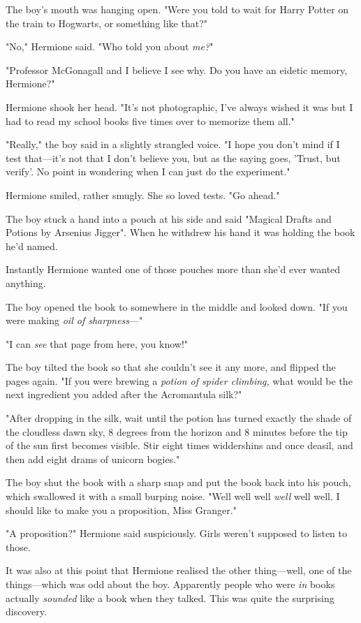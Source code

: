 The boy's mouth was hanging open. "Were you told to wait for Harry Potter on the train to Hogwarts, or something like that?"

"No," Hermione said. "Who told you about \emph{me?}"

"Professor McGonagall and I believe I see why. Do you have an eidetic memory, Hermione?"

Hermione shook her head. "It's not photographic, I've always wished it was but I had to read my school books five times over to memorize them all."

"Really," the boy said in a slightly strangled voice. "I hope you don't mind if I test that---it's not that I don't believe you, but as the saying goes, 'Trust, but verify'. No point in wondering when I can just do the experiment."

Hermione smiled, rather smugly. She so loved tests. "Go ahead."

The boy stuck a hand into a pouch at his side and said "Magical Drafts and Potions by Arsenius Jigger". When he withdrew his hand it was holding the book he'd named.

Instantly Hermione wanted one of those pouches more than she'd ever wanted anything.

The boy opened the book to somewhere in the middle and looked down. "If you were making \emph{oil of sharpness}---"

"I can \emph{see} that page from here, you know!"

The boy tilted the book so that she couldn't see it any more, and flipped the pages again. "If you were brewing a \emph{potion of spider climbing,} what would be the next ingredient you added after the Acromantula silk?"

"After dropping in the silk, wait until the potion has turned exactly the shade of the cloudless dawn sky, 8 degrees from the horizon and 8 minutes before the tip of the sun first becomes visible. Stir eight times widdershins and once deasil, and then add eight drams of unicorn bogies."

The boy shut the book with a sharp snap and put the book back into his pouch, which swallowed it with a small burping noise. "Well well well \emph{well} well well. I should like to make you a proposition, Miss Granger."

"A proposition?" Hermione said suspiciously. Girls weren't supposed to listen to those.

It was also at this point that Hermione realised the other thing---well, one of the things---which was odd about the boy. Apparently people who were \emph{in} books actually \emph{sounded} like a book when they talked. This was quite the surprising discovery.

